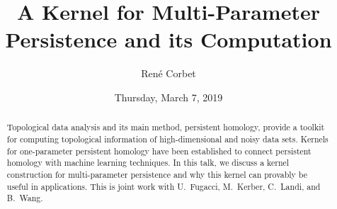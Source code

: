 \documentclass{UAmathtalk}
\author{Ren\'e Corbet}
\title{A Kernel for Multi-Parameter Persistence and its Computation}
\date{Thursday, March 7, 2019}
\begin{document}
\maketitle

\begin{abstract}
Topological data analysis and its main method, persistent homology, provide a toolkit for computing topological information of high-dimensional and noisy data sets. Kernels for one-parameter persistent homology have been established to connect persistent homology with machine learning techniques. In this talk, we discuss a kernel construction for multi-parameter persistence and why this kernel can provably be useful in applications. This is joint work with U.~Fugacci, M.~Kerber, C.~Landi, and B.~Wang.
\end{abstract}
\end{document}
